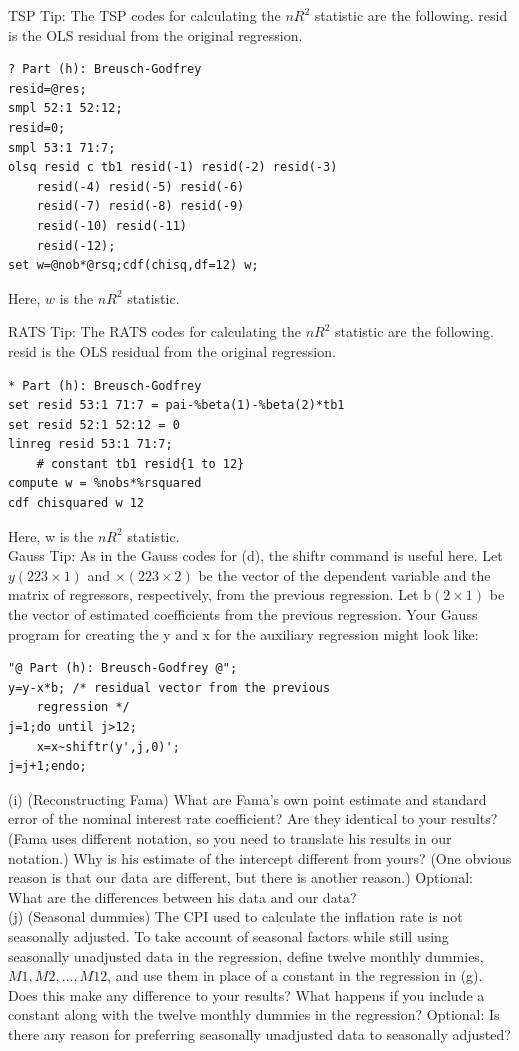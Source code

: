 \documentclass[10pt]{article}
\begin{document}
TSP Tip: The TSP codes for calculating the $n R^{2}$ statistic are the following. resid is the OLS residual from the original regression.

\begin{verbatim}
? Part (h): Breusch-Godfrey
resid=@res;
smpl 52:1 52:12;
resid=0;
smpl 53:1 71:7;
olsq resid c tb1 resid(-1) resid(-2) resid(-3)
    resid(-4) resid(-5) resid(-6)
    resid(-7) resid(-8) resid(-9)
    resid(-10) resid(-11)
    resid(-12);
set w=@nob*@rsq;cdf(chisq,df=12) w;
\end{verbatim}

Here, $w$ is the $n R^{2}$ statistic.

RATS Tip: The RATS codes for calculating the $n R^{2}$ statistic are the following. resid is the OLS residual from the original regression.

\begin{verbatim}
* Part (h): Breusch-Godfrey
set resid 53:1 71:7 = pai-%beta(1)-%beta(2)*tb1
set resid 52:1 52:12 = 0
linreg resid 53:1 71:7;
    # constant tb1 resid{1 to 12}
compute w = %nobs*%rsquared
cdf chisquared w 12
\end{verbatim}

Here, w is the $n R^{2}$ statistic.\\
Gauss Tip: As in the Gauss codes for (d), the shiftr command is useful here. Let $y(223 \times 1)$ and $\times(223 \times 2)$ be the vector of the dependent variable and the matrix of regressors, respectively, from the previous regression. Let $\mathrm{b}(2 \times 1)$ be the vector of estimated coefficients from the previous regression. Your Gauss program for creating the y and x for the auxiliary regression might look like:

\begin{verbatim}
"@ Part (h): Breusch-Godfrey @";
y=y-x*b; /* residual vector from the previous
    regression */
j=1;do until j>12;
    x=x~shiftr(y',j,0)';
j=j+1;endo;
\end{verbatim}

(i) (Reconstructing Fama) What are Fama's own point estimate and standard error of the nominal interest rate coefficient? Are they identical to your results? (Fama uses different notation, so you need to translate his results in our notation.) Why is his estimate of the intercept different from yours? (One obvious reason is that our data are different, but there is another reason.) Optional: What are the differences between his data and our data?\\
(j) (Seasonal dummies) The CPI used to calculate the inflation rate is not seasonally adjusted. To take account of seasonal factors while still using seasonally unadjusted data in the regression, define twelve monthly dummies, $M 1, M 2, \ldots, M 12$, and use them in place of a constant in the regression in (g). Does this make any difference to your results? What happens if you include a constant along with the twelve monthly dummies in the regression? Optional: Is there any reason for preferring seasonally unadjusted data to seasonally adjusted?
\end{document}
